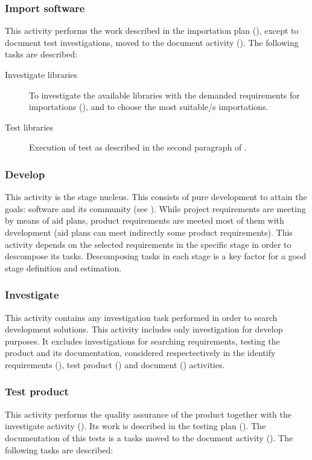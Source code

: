 \documentclass[twocolumn, 9pt]{extarticle}
\begin{document}
\subsubsection{Import software}
\label{sssec:import-software}
This activity performs the work described in the importation plan
(), except to document test
investigations, moved to the document activity
(). The following tasks are described:

\begin{description}
  \item[Investigate libraries] To investigate the available libraries
    with the demanded requirements for importations
    (), and to choose the
    most suitable/s importations.
  \item[Test libraries] Execution of test as described in
    the second paragraph of .
\end{description}

\subsubsection{Develop}
\label{sssec:develop}
This activity is the stage nucleus. This consists of pure development
to attain the \fav goals: \fav software and its community (see
\favc). While project requirements are meeting by means of aid
plans, product requirements are meeted most of them with
development (aid plans can meet indirectly some product
requirements). This activity depends on the selected requirements in
the specific stage in order to descompose its tasks. Descomposing
tasks in each stage is a key factor for a good stage definition and
estimation.

\subsubsection{Investigate}
\label{sssec:investigate}
This activity contains any investigation task performed in order to
search development solutions. This activity includes only
investigation for develop purposes. It excludes
investigations for searching requirements, testing the product and its
documentation, considered respectectively in the identify requirements
(), test product
() and document ()
activities.

\subsubsection{Test product}
\label{sssec:test-product}
This activity performs the quality assurance of the product together
with the investigate activity (). Its work
is described in the testing plan (). The
documentation of this tests is a tasks moved to the document activity
(). The following tasks are described:
\end{document}
